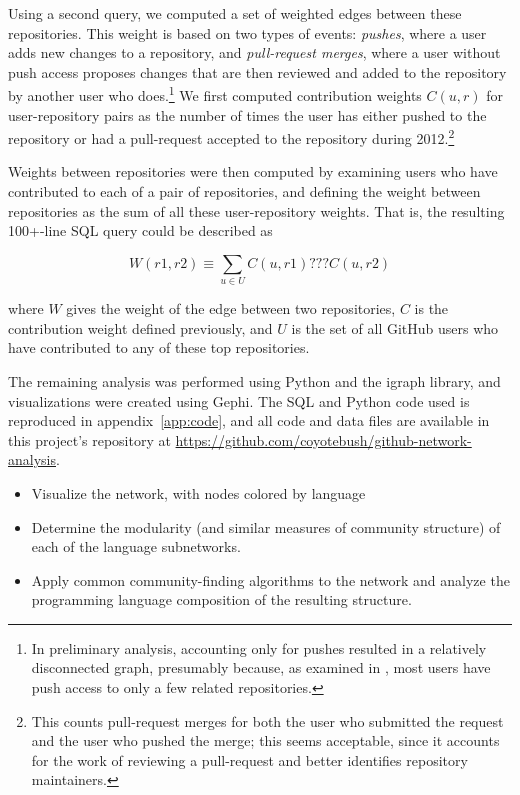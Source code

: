 \documentclass[twocolumn]{article}
\begin{document}
Using a second query, we computed a set of weighted edges between these
repositories. This weight is based on two types of events: \emph{pushes}, where
a user adds new changes to a repository, and \emph{pull-request merges}, where a
user without push access proposes changes that are then reviewed and added to
the repository by another user who does.\footnote{In preliminary analysis,
accounting only for pushes resulted in a relatively disconnected graph,
presumably because, as examined in \cite{khadke}, most users have push access to only a few related
repositories.} We first computed contribution weights $C(u, r)$ for
user-repository pairs as the number of times the user has either pushed to the
repository or had a pull-request accepted to the repository during
2012.\footnote{This counts pull-request merges for both the user who submitted
the request and the user who pushed the merge; this seems acceptable, since it
accounts for the work of reviewing a pull-request and better identifies
repository maintainers.}

Weights between repositories were then computed by examining users who have
contributed to each of a pair of repositories, and defining the weight between
repositories as the sum of all these user-repository weights. That is, the
resulting 100+-line SQL query could be described as

\begin{equation}
    W(r1, r2) \equiv \sum_{u \in U} C(u, r1) ??? C(u, r2)
\end{equation}

where $W$ gives the weight of the edge between two repositories, $C$ is the
contribution weight defined previously, and $U$ is the set of all GitHub users
who have contributed to any of these top repositories.

The remaining analysis was performed using Python and the igraph library, and
visualizations were created using Gephi. The SQL and Python code used is
reproduced in appendix~\ref{app:code}, and all code and data files are available
in this project's repository at
\url{https://github.com/coyotebush/github-network-analysis}.

\begin{itemize}
    \item Visualize the network, with nodes colored by language
    \item Determine the modularity (and similar measures of community structure)
        of each of the language subnetworks.
    \item Apply common community-finding algorithms to the network and analyze
        the programming language composition of the resulting structure.
\end{itemize}
\end{document}
